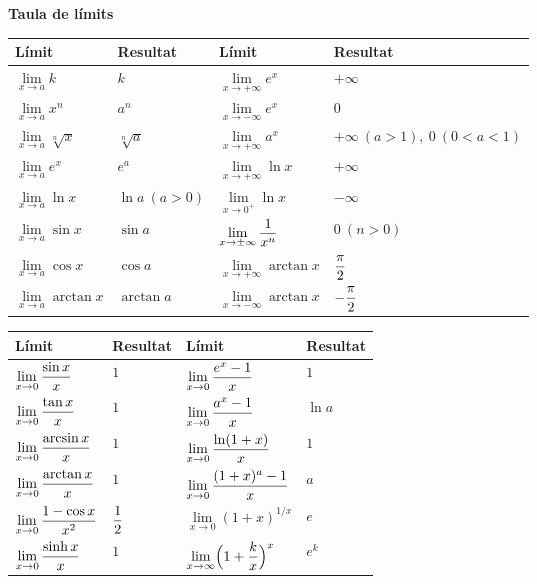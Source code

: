 \newcommand{\ft}[3]{\begin{tabular}{@{}l@{\hspace{0.8em}}l@{\hspace{3.2em}}l@{\hspace{0.8em}}l@{}}\toprule\textbf{#1}&\textbf{#2}&\textbf{#1}&\textbf{#2}\\\midrule #3 \\\bottomrule\end{tabular}}
\newcommand{\sub}[1]{\needspace{8\baselineskip}\par\vspace{0.9em}{\bfseries #1}\par\vspace{3pt}}
\small\renewcommand{\arraystretch}{1.6}
\textbf{\large Taula de límits}\par\vspace{3pt}
\ft{Límit}{Resultat}{
$\lim\limits_{x\to a}k$ & $k$ & $\lim\limits_{x\to+\infty}e^{x}$ & $+\infty$ \\
$\lim\limits_{x\to a}x^{n}$ & $a^{n}$ & $\lim\limits_{x\to-\infty}e^{x}$ & $0$ \\
$\lim\limits_{x\to a}\sqrt[n]{x}$ & $\sqrt[n]{a}$ & $\lim\limits_{x\to+\infty}a^{x}$ & $+\infty\ (a>1),\ 0\ (0<a<1)$ \\
$\lim\limits_{x\to a}e^{x}$ & $e^{a}$ & $\lim\limits_{x\to+\infty}\ln x$ & $+\infty$ \\
$\lim\limits_{x\to a}\ln x$ & $\ln a\ (a>0)$ & $\lim\limits_{x\to0^{+}}\ln x$ & $-\infty$ \\
$\lim\limits_{x\to a}\sin x$ & $\sin a$ & $\lim\limits_{x\to\pm\infty}\displaystyle \frac{1}{x^{n}}$ & $0\ (n>0)$ \\
$\lim\limits_{x\to a}\cos x$ & $\cos a$ & $\lim\limits_{x\to+\infty}\arctan x$ & $\displaystyle \frac{\pi}{2}$ \\
$\lim\limits_{x\to a}\arctan x$ & $\arctan a$ & $\lim\limits_{x\to-\infty}\arctan x$ & $-\displaystyle \frac{\pi}{2}$}
\sub{Límits notables}
\ft{Límit}{Resultat}{
$\lim\limits_{x\to0}\displaystyle \frac{\sin x}{x}$ & $1$ & $\lim\limits_{x\to0}\displaystyle \frac{e^{x}-1}{x}$ & $1$ \\
$\lim\limits_{x\to0}\displaystyle \frac{\tan x}{x}$ & $1$ & $\lim\limits_{x\to0}\displaystyle \frac{a^{x}-1}{x}$ & $\ln a$ \\
$\lim\limits_{x\to0}\displaystyle \frac{\arcsin x}{x}$ & $1$ & $\lim\limits_{x\to0}\displaystyle \frac{\ln(1+x)}{x}$ & $1$ \\
$\lim\limits_{x\to0}\displaystyle \frac{\arctan x}{x}$ & $1$ & $\lim\limits_{x\to0}\displaystyle \frac{(1+x)^{a}-1}{x}$ & $a$ \\
$\lim\limits_{x\to0}\displaystyle \frac{1-\cos x}{x^{2}}$ & $\displaystyle \frac12$ & $\lim\limits_{x\to0}(1+x)^{1/x}$ & $e$ \\
$\lim\limits_{x\to0}\displaystyle \frac{\sinh x}{x}$ & $1$ & $\lim\limits_{x\to\infty}\Bigl(1+\displaystyle \frac{k}{x}\Bigr)^{x}$ & $e^{k}$}
